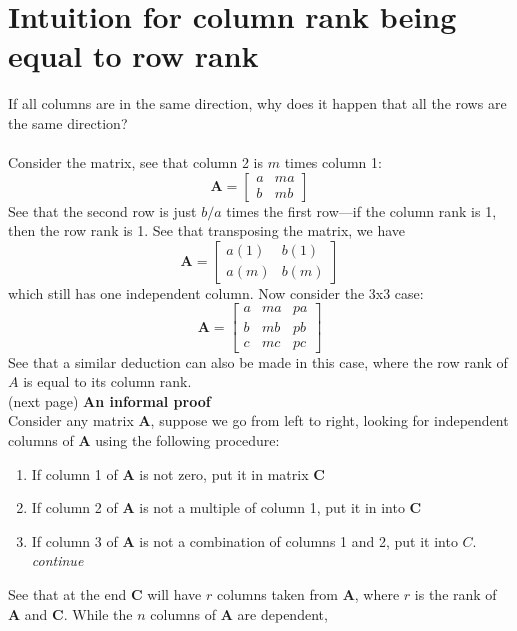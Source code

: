 \documentclass{report}
\begin{document}
\section{Intuition for column rank being equal to row rank}
If all columns are in the same direction, why does it happen that all the rows are the same direction?\\
\vspace{1mm}\\
Consider the matrix, see that column 2 is $m$ times column 1:
\begin{equation*}
\bm A=\left[\begin{array}{cc}
a&ma\\
b&mb
\end{array}\right]
\end{equation*}
See that the second row is just $b/a$ times the first row---if the column rank is 1, then the row rank is 1. See that transposing the matrix, we have
\begin{equation*}
\bm A=\left[\begin{array}{cc}
a(1)&b(1)\\
a(m)&b(m)
\end{array}\right]
\end{equation*}
which still has one independent column. Now consider the 3x3 case:
\begin{equation*}
\bm A=\left[\begin{array}{ccc}
a&ma&pa\\
b&mb&pb\\
c&mc&pc
\end{array}\right]
\end{equation*}
See that a similar deduction can also be made in this case, where the row rank of $A$ is equal to its column rank.\\
(next page)\newpage
\noindent\textbf{An informal proof}\\
Consider any matrix $\bm A$, suppose we go from left to right, looking for independent columns of $\bm A$ using the following procedure:
\begin{enumerate}
\item If column 1 of $\bm A$ is not zero, put it in matrix $\bm C$
\item If column 2 of $\bm A$ is not a multiple of column 1, put it in into $\bm C$
\item If column 3 of $\bm A$ is not a combination of columns 1 and 2, put it into $C$. \textit{continue}
\end{enumerate}
See that at the end $\bm C$ will have $r$ columns taken from $\bm A$, where $r$ is the rank of $\bm A$ and $\bm C$. While the $n$ columns of $\bm A$ are dependent, 
\end{document}
